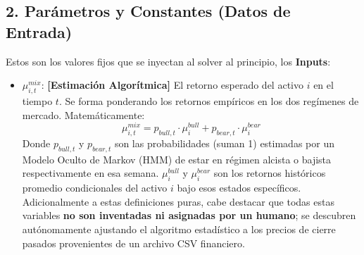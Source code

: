 \documentclass[11pt,a4paper]{article}
\begin{document}
\subsection{2. Parámetros y Constantes (Datos de Entrada)}
Estos son los valores fijos que se inyectan al solver al principio, los \textbf{Inputs}:
\begin{itemize}
    \item $\mu^{mix}_{i,t}$: \textbf{[Estimación Algorítmica]} El retorno esperado del activo $i$ en el tiempo $t$. Se forma ponderando los retornos empíricos en los dos regímenes de mercado. Matemáticamente:
    \[ \mu^{mix}_{i,t} = p_{bull, t} \cdot \mu^{bull}_{i} + p_{bear, t} \cdot \mu^{bear}_{i} \]
    Donde $p_{bull, t}$ y $p_{bear, t}$ son las probabilidades (suman 1) estimadas por un Modelo Oculto de Markov (HMM) de estar en régimen alcista o bajista respectivamente en esa semana. $\mu^{bull}_{i}$ y $\mu^{bear}_{i}$ son los retornos históricos promedio condicionales del activo $i$ bajo esos estados específicos. Adicionalmente a estas definiciones puras, cabe destacar que todas estas variables \textbf{no son inventadas ni asignadas por un humano}; se descubren autónomamente ajustando el algoritmo estadístico a los precios de cierre pasados provenientes de un archivo CSV financiero.
    

\end{itemize}
\end{document}
